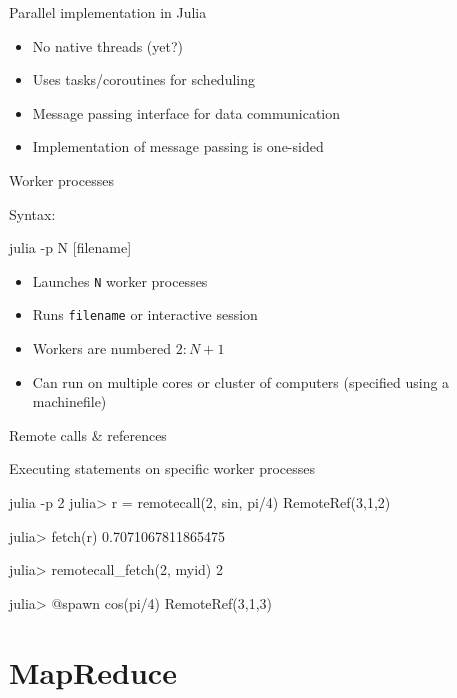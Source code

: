 \documentclass{beamer}
\begin{document}
	\begin{frame}{Parallel implementation in Julia}
		\begin{itemize}
			\item{No native threads (yet?)}
			\item{Uses tasks/coroutines for scheduling}
			\item{Message passing interface for data communication}
			\item{Implementation of message passing is one-sided}
		\end{itemize}
	\end{frame}
	
	\begin{frame}[fragile]{Worker processes}
		\begin{block}{Syntax:}
		\begin{semiverbatim}
			julia -p N [filename]
		\end{semiverbatim}
		\end{block}
		\begin{itemize}
			\item{Launches \verb+N+ worker processes}
			\item{Runs \verb+filename+ or interactive session}
			\item{Workers are numbered $2:N+1$}
			\item{Can run on multiple cores or cluster of computers (specified using a machinefile)}
		\end{itemize}
	\end{frame}

	\begin{frame}[fragile]{Remote calls \& references}
		\begin{block}{Executing statements on specific worker processes}
		\begin{semiverbatim}
		julia -p 2
		julia> r = remotecall(2, sin, pi/4)
		RemoteRef(3,1,2) 

		julia> fetch(r)
		0.7071067811865475

		julia> remotecall\_fetch(2, myid)
		2
		
		julia> @spawn cos(pi/4) 
		RemoteRef(3,1,3)
		\end{semiverbatim}
		\end{block}
	\end{frame}

	\section{MapReduce}
\end{document}
